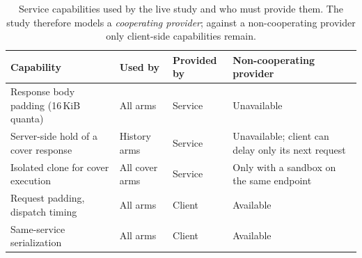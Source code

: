 \begin{table}[t]\centering\footnotesize
\caption{Service capabilities used by the live study and who must provide them. The study therefore models a \emph{cooperating provider}; against a non-cooperating provider only client-side capabilities remain.}\label{tab:service-contract}
\setlength{\tabcolsep}{3pt}
\begin{tabularx}{\columnwidth}{@{}P{.3\columnwidth}P{.2\columnwidth}P{.14\columnwidth}Y@{}}\toprule
Capability & Used by & Provided by & Non-cooperating provider \\\midrule
Response body padding (16\,KiB quanta) & All arms & Service & Unavailable \\\addlinespace[2pt]
Server-side hold of a cover response & History arms & Service & Unavailable; client can delay only its next request \\\addlinespace[2pt]
Isolated clone for cover execution & All cover arms & Service & Only with a sandbox on the same endpoint \\\addlinespace[2pt]
Request padding, dispatch timing & All arms & Client & Available \\\addlinespace[2pt]
Same-service serialization & All arms & Client & Available \\\bottomrule
\end{tabularx}\end{table}
